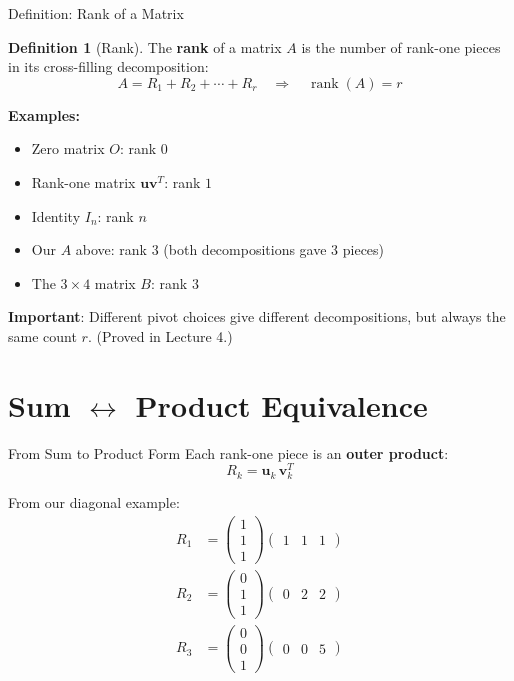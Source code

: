 \documentclass[10pt]{beamer}
\theoremstyle{definition}
\newtheorem{defi}{Definition}[section]
\newcommand{\x}[1]{\alert{\textbf{#1}}}
\begin{document}
\begin{frame}{Definition: Rank of a Matrix}
\begin{defi}[Rank]
The \x{rank} of a matrix $A$ is the number of rank-one pieces in its cross-filling decomposition:
$$A = R_1 + R_2 + \cdots + R_r \quad \Longrightarrow \quad \operatorname{rank}(A) = r$$
\end{defi}

\vspace{0.3cm}
\textbf{Examples:}
\begin{itemize}
\item Zero matrix $O$: rank $0$
\item Rank-one matrix $\mathbf{u}\mathbf{v}^T$: rank $1$
\item Identity $I_n$: rank $n$
\item Our $A$ above: rank $3$ (both decompositions gave 3 pieces)
\item The $3 \times 4$ matrix $B$: rank $3$
\end{itemize}

\vspace{0.2cm}
\textbf{Important}: Different pivot choices give different decompositions, but always the same count $r$. (Proved in Lecture 4.)
\end{frame}

\section{Sum $\leftrightarrow$ Product Equivalence}

\begin{frame}{From Sum to Product Form}
Each rank-one piece is an \x{outer product}:
$$R_k = \mathbf{u}_k \, \mathbf{v}_k^T$$

\vfill
From our diagonal example:
\begin{align*}
R_1 &= \begin{pmatrix} 1 \\ 1 \\ 1 \end{pmatrix}
\begin{pmatrix} 1 & 1 & 1 \end{pmatrix} \\[6pt]
R_2 &= \begin{pmatrix} 0 \\ 1 \\ 1 \end{pmatrix}
\begin{pmatrix} 0 & 2 & 2 \end{pmatrix} \\[6pt]
R_3 &= \begin{pmatrix} 0 \\ 0 \\ 1 \end{pmatrix}
\begin{pmatrix} 0 & 0 & 5 \end{pmatrix}
\end{align*}
\end{frame}
\end{document}
